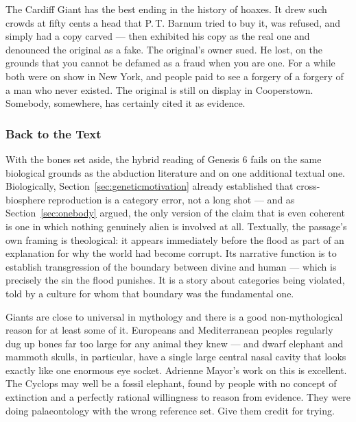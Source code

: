 \begin{funfact}
The Cardiff Giant has the best ending in the history of hoaxes. It drew such crowds at fifty
cents a head that P.\,T. Barnum tried to buy it, was refused, and simply had a copy carved ---
then exhibited his copy as the real one and denounced the original as a fake. The original's
owner sued. He lost, on the grounds that you cannot be defamed as a fraud when you are one.
For a while both were on show in New York, and people paid to see a forgery of a forgery of a
man who never existed. The original is still on display in Cooperstown. Somebody, somewhere,
has certainly cited it as evidence.
\end{funfact}

\subsubsection{Back to the Text}

With the bones set aside, the hybrid reading of Genesis 6 fails on the same biological grounds
as the abduction literature and on one additional textual one. Biologically, Section~\ref{sec:geneticmotivation}
already established that cross-biosphere reproduction is a category error, not a long shot ---
and as Section~\ref{sec:onebody} argued, the only version of the claim that is even coherent is
one in which nothing genuinely alien is involved at all.
Textually, the passage's own framing is theological: it appears immediately before the flood as
part of an explanation for why the world had become corrupt. Its narrative function is to
establish transgression of the boundary between divine and human --- which is precisely the sin
the flood punishes. It is a story about categories being violated, told by a culture for whom
that boundary was the fundamental one. 

\begin{funfact}
Giants are close to universal in mythology and there is a good non-mythological reason for at
least some of it. Europeans and Mediterranean peoples regularly dug up bones far too large for
any animal they knew --- and dwarf elephant and mammoth skulls, in particular, have a single
large central nasal cavity that looks exactly like one enormous eye socket. Adrienne Mayor's work
on this is excellent. The Cyclops may well be a fossil elephant, found by people with no concept
of extinction and a perfectly rational willingness to reason from evidence. They were doing
palaeontology with the wrong reference set. Give them credit for trying.
\end{funfact}

